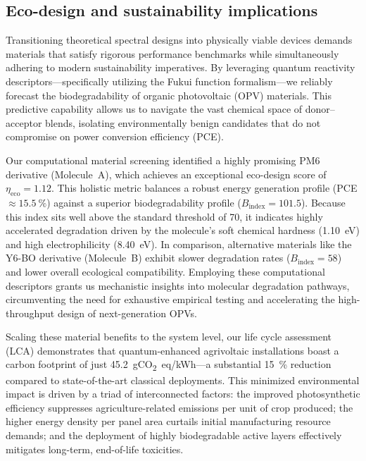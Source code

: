 \subsection{Eco-design and sustainability implications}

Transitioning theoretical spectral designs into physically viable devices demands materials that satisfy rigorous performance benchmarks while simultaneously adhering to modern sustainability imperatives. By leveraging quantum reactivity descriptors---specifically utilizing the Fukui function formalism---we reliably forecast the biodegradability of organic photovoltaic (OPV) materials. This predictive capability allows us to navigate the vast chemical space of donor--acceptor blends, isolating environmentally benign candidates that do not compromise on power conversion efficiency (PCE).

Our computational material screening identified a highly promising PM6 derivative (Molecule~A), which achieves an exceptional eco-design score of $\eta_{\mathrm{eco}} = \num{1.12}$. This holistic metric balances a robust energy generation profile (PCE $\approx \SI{15.5}{\percent}$) against a superior biodegradability profile ($B_{\mathrm{index}} = \num{101.5}$). Because this index sits well above the standard threshold of \num{70}, it indicates highly accelerated degradation driven by the molecule's soft chemical hardness (\SI{1.10}{\electronvolt}) and high electrophilicity (\SI{8.40}{\electronvolt}). In comparison, alternative materials like the Y6-BO derivative (Molecule~B) exhibit slower degradation rates ($B_{\mathrm{index}} = \num{58}$) and lower overall ecological compatibility. Employing these computational descriptors grants us mechanistic insights into molecular degradation pathways, circumventing the need for exhaustive empirical testing and accelerating the high-throughput design of next-generation OPVs.

Scaling these material benefits to the system level, our life cycle assessment (LCA) demonstrates that quantum-enhanced agrivoltaic installations boast a carbon footprint of just \SI{45.2}{gCO_2eq/kWh}---a substantial \SI{15}{\percent} reduction compared to state-of-the-art classical deployments. This minimized environmental impact is driven by a triad of interconnected factors: the improved photosynthetic efficiency suppresses agriculture-related emissions per unit of crop produced; the higher energy density per panel area curtails initial manufacturing resource demands; and the deployment of highly biodegradable active layers effectively mitigates long-term, end-of-life toxicities.

